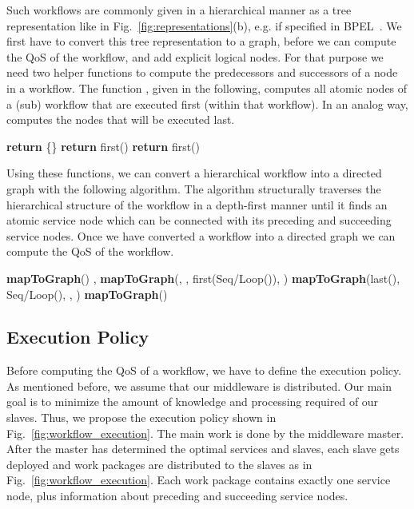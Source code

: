 \documentclass[10pt, conference, compsocconf]{IEEEtran}
\begin{document}
\noindent Such workflows are commonly given in a hierarchical manner
  as a tree representation like in Fig.~\ref{fig:representations}(b), e.g. if specified in BPEL~\cite{BPEL2006}.
We first have to convert this tree representation to a graph, before we can compute the QoS of the workflow,
	and add explicit logical nodes.
For that purpose we need two helper functions
	to compute the predecessors and successors of a node in a workflow.
The function , given in the following, computes all atomic nodes of a (sub) workflow  that are executed first (within that workflow).
In an analog way,  computes the nodes that will be executed last.

\begin{algorithm}
	\label{algo:first}
	\begin{algorithmic}[1]
			\If{}
				\State \textbf{return} \{\}
			\ElsIf{}
				\State \textbf{return} first()
			\ElsIf{}
				\State \textbf{return} first()
			\EndIf
		\EndProcedure
	\end{algorithmic}
\end{algorithm}

\noindent Using these functions, we can convert a hierarchical workflow into a directed graph with the following  algorithm.
The algorithm structurally traverses the hierarchical structure of the workflow 
	in a depth-first manner until it finds an atomic service node which can be connected with its preceding and succeeding service nodes.
Once we have converted a workflow into a directed graph we can compute the QoS of the workflow.

\begin{algorithm}
	\label{algo:mapToGraph}
	\begin{algorithmic}[1]
			\If{}
				\State 
	    	\State 
			\ElsIf{}
				\State \textbf{mapToGraph}()
			\ElsIf{}
				\State , 
	      \State \textbf{mapToGraph}(, , first(Seq/Loop()), )
	      \State \textbf{mapToGraph}(last(), Seq/Loop(), , )
			\ElsIf{}
				\State \textbf{mapToGraph}()
			\EndIf
		\EndProcedure
	\end{algorithmic}
\end{algorithm}

\subsection{Execution Policy}
\label{exPolicy}
\noindent Before computing the QoS of a workflow,
	we have to define the execution policy.
As mentioned before, we assume that our middleware is distributed.
Our main goal is to minimize the amount of knowledge and processing required of our slaves.
Thus, we propose the execution policy shown in Fig.~\ref{fig:workflow_execution}.
The main work is done by the middleware master.
After the master has determined the optimal services and slaves,
	each slave gets deployed and work packages are distributed to the slaves as in Fig.~\ref{fig:workflow_execution}.
Each work package contains exactly one service node, plus information about preceding and succeeding service nodes.
\end{document}
